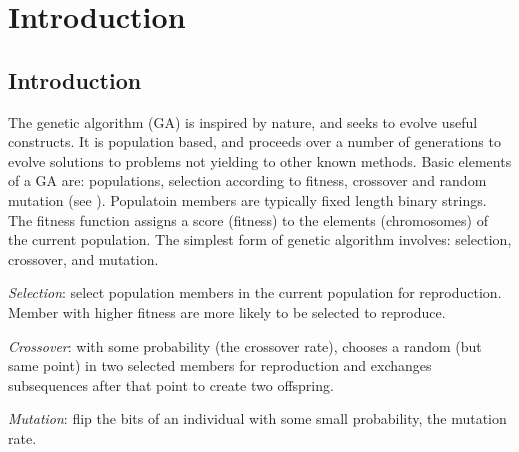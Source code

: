 \chapter{Introduction} \label{ch:introduction}
\section{Introduction}
The genetic algorithm (GA) is inspired by nature, and seeks to evolve useful constructs. It is population based, and 
proceeds over a number of generations to evolve solutions to problems not yielding to other known methods. 
Basic elements of a GA are: 
populations, selection according to fitness, crossover and random mutation (see \cite{Mitchell1999}). 
Populatoin members are typically fixed length binary strings.   
The fitness function assigns a score (fitness) to the elements (chromosomes) of 
the current population. The simplest form of genetic algorithm involves: selection, crossover, and mutation.

\textit{Selection}: select population members in the current population for reproduction. 
Member with higher fitness are more likely to be selected to reproduce.

\textit{Crossover}: with some probability (the crossover rate), chooses a random (but same point) in two selected members for reproduction 
and exchanges subsequences after that point to create two offspring.

\textit{Mutation}: flip the bits of an individual with some small probability, 
the mutation rate.


